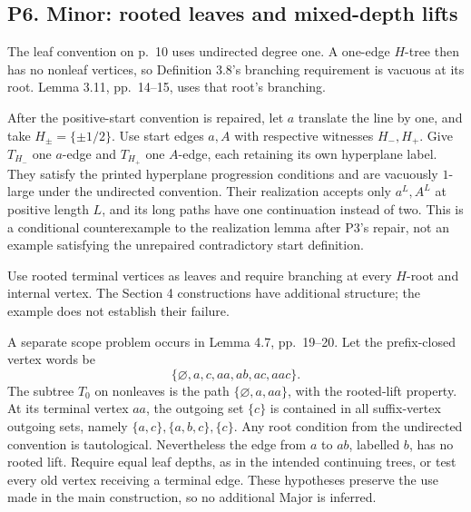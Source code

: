 \documentclass[10pt]{article}
\begin{document}
\subsection*{P6. Minor: rooted leaves and mixed-depth lifts}
The leaf convention on p. 10 uses undirected degree one. A one-edge \(H\)-tree then has no nonleaf vertices, so Definition 3.8’s branching requirement is vacuous at its root. Lemma 3.11, pp. 14–15, uses that root’s branching.\par
After the positive-start convention is repaired, let \(a\) translate the line by one, and take \(H_\pm=\{\pm1/2\}\). Use start edges \(a,A\) with respective witnesses \(H_-,H_+\). Give \(T_{H_-}\) one \(a\)-edge and \(T_{H_+}\) one \(A\)-edge, each retaining its own hyperplane label. They satisfy the printed hyperplane progression conditions and are vacuously \(1\)-large under the undirected convention. Their realization accepts only \(a^L,A^L\) at positive length \(L\), and its long paths have one continuation instead of two. This is a conditional counterexample to the realization lemma after P3’s repair, not an example satisfying the unrepaired contradictory start definition.\par
Use rooted terminal vertices as leaves and require branching at every \(H\)-root and internal vertex. The Section 4 constructions have additional structure; the example does not establish their failure.\par
A separate scope problem occurs in Lemma 4.7, pp. 19–20. Let the prefix-closed vertex words be \[\{\varnothing,a,c,aa,ab,ac,aac\}.\] The subtree \(T_0\) on nonleaves is the path \(\{\varnothing,a,aa\}\), with the rooted-lift property. At its terminal vertex \(aa\), the outgoing set \(\{c\}\) is contained in all suffix-vertex outgoing sets, namely \(\{a,c\},\{a,b,c\},\{c\}\). Any root condition from the undirected convention is tautological. Nevertheless the edge from \(a\) to \(ab\), labelled \(b\), has no rooted lift. Require equal leaf depths, as in the intended continuing trees, or test every old vertex receiving a terminal edge. These hypotheses preserve the use made in the main construction, so no additional Major is inferred.\par
\end{document}
